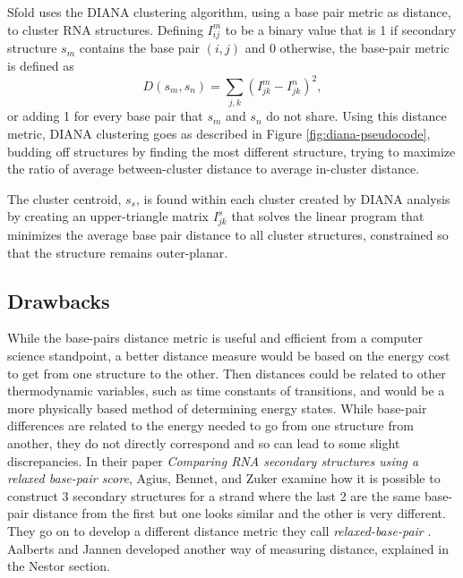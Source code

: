 Sfold uses the DIANA clustering algorithm, using a base pair metric as
distance, to cluster RNA structures. Defining $I_{ij}^m$ to be a
binary value that is 1 if secondary structure $s_m$ contains the base
pair $(i,j)$ and 0 otherwise, the base-pair metric is defined as
\begin{equation}
D(s_m, s_n) = \sum_{j,k} (I^m_{jk} - I^n_{jk})^2,
\end{equation}
or adding 1 for every base pair that $s_m$ and $s_n$ do not
share. Using this distance metric, DIANA clustering goes as described
in Figure \ref{fig:diana-pseudocode}, budding off structures by
finding the most different structure, trying to maximize the ratio of
average between-cluster distance to average in-cluster distance.

The cluster centroid, $s_s$, is found within each cluster created by
DIANA analysis by creating an upper-triangle matrix $I^s_{jk}$ that
solves the linear program that minimizes the average base pair
distance to all cluster structures, constrained so that the structure
remains outer-planar.

\subsection{Drawbacks}

While the base-pairs distance metric is useful and efficient from a
computer science standpoint, a better distance measure would be based
on the energy cost to get from one structure to the other. Then
distances could be related to other thermodynamic variables, such as
time constants of transitions, and would be a more physically based
method of determining energy states. While base-pair differences are
related to the energy needed to go from one structure from another,
they do not directly correspond and so can lead to some slight
discrepancies. In their paper \emph{Comparing RNA secondary structures
  using a relaxed base-pair score}, Agius, Bennet, and Zuker examine
how it is possible to construct 3 secondary structures for a strand
where the last 2 are the same base-pair distance from the first but
one looks similar and the other is very different. They go on to
develop a different distance metric they call \emph{relaxed-base-pair}
\cite{agius2010comparing}. Aalberts and Jannen developed another way
of measuring distance, explained in the Nestor section.

